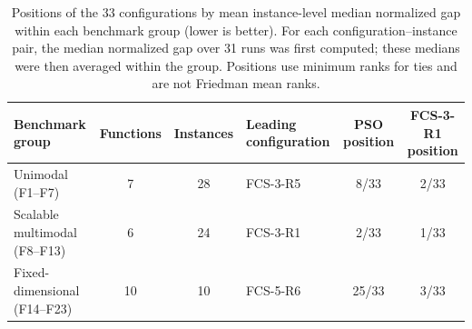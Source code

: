 \begin{table}[!htbp]
\centering
\small
\caption{Positions of the 33 configurations by mean instance-level median normalized gap within each benchmark group (lower is better). For each configuration--instance pair, the median normalized gap over 31 runs was first computed; these medians were then averaged within the group. Positions use minimum ranks for ties and are not Friedman mean ranks.}
\label{tab:class_summary}
\setlength{\tabcolsep}{3pt}
\begin{tabularx}{\textwidth}{@{}>{\raggedright\arraybackslash}Xcc>{\raggedright\arraybackslash}p{2.7cm}cc@{}}
\toprule
\textbf{Benchmark group} & \textbf{Functions} & \textbf{Instances} & 
\textbf{Leading configuration} & \textbf{PSO position} & \textbf{FCS-3-R1 position} \\
\midrule
Unimodal (F1--F7) & 7 & 28 & FCS-3-R5 & 8/33 & 2/33 \\
Scalable multimodal (F8--F13) & 6 & 24 & FCS-3-R1 & 2/33 & 1/33 \\
Fixed-dimensional (F14--F23) & 10 & 10 & FCS-5-R6 & 25/33 & 3/33 \\
\bottomrule
\end{tabularx}
\end{table}
